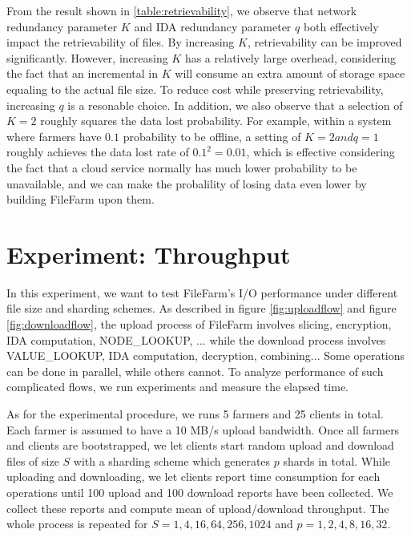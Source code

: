 From the result shown in \ref{table:retrievability}, we observe that network redundancy parameter $K$ and IDA redundancy parameter $q$ both effectively impact the retrievability of files. By increasing $K$, retrievability can be improved significantly. However, increasing $K$ has a relatively large overhead, considering the fact that an incremental in $K$ will consume an extra amount of storage space equaling to the actual file size. To reduce cost while preserving retrievability, increasing $q$ is a resonable choice. In addition, we also observe that a selection of $K=2$ roughly squares the data lost probability. For example, within a system where farmers have $0.1$ probability to be offline, a setting of $K=2 and q=1$ roughly achieves the data lost rate of $0.1^{2}=0.01$, which is effective considering the fact that a cloud service normally has much lower probability to be unavailable, and we can make the probalility of losing data even lower by building FileFarm upon them.

\newpage

\section{Experiment: Throughput}
\label{s:expthroughput}

In this experiment, we want to test FileFarm's I/O performance under different file size and sharding schemes. As described in figure \ref{fig:uploadflow} and figure \ref{fig:downloadflow}, the upload process of FileFarm involves slicing, encryption, IDA computation, NODE\_LOOKUP, ... while the download process involves VALUE\_LOOKUP, IDA computation, decryption, combining... Some operations can be done in parallel, while others cannot. To analyze performance of such complicated flows, we run experiments and measure the elapsed time.

As for the experimental procedure, we runs 5 farmers and 25 clients in total. Each farmer is assumed to have a 10 MB/s upload bandwidth. Once all farmers and clients are bootstrapped, we let clients start random upload and download files of size $S$ with a sharding scheme which generates $p$ shards in total. While uploading and downloading, we let clients report time consumption for each operations until 100 upload and 100 download reports have been collected. We collect these reports and compute mean of upload/download throughput. The whole process is repeated for $S=1,4,16,64,256,1024$ and $p=1,2,4,8,16,32$.

